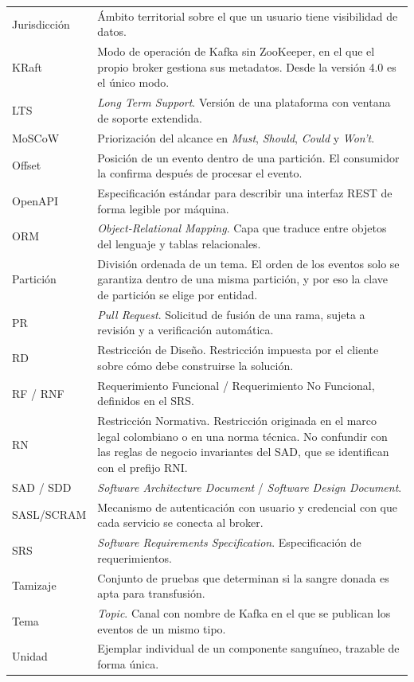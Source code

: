 \documentclass[11pt,a4paper]{article}
\begin{document}
\begin{longtable}{L{3.6cm} L{11.0cm}}
Jurisdicción & Ámbito territorial sobre el que un usuario tiene visibilidad de datos. \\
KRaft & Modo de operación de Kafka sin ZooKeeper, en el que el propio broker gestiona sus metadatos. Desde la versión 4.0 es el único modo. \\
LTS & \emph{Long Term Support}. Versión de una plataforma con ventana de soporte extendida. \\
MoSCoW & Priorización del alcance en \emph{Must}, \emph{Should}, \emph{Could} y \emph{Won't}. \\
Offset & Posición de un evento dentro de una partición. El consumidor la confirma después de procesar el evento. \\
OpenAPI & Especificación estándar para describir una interfaz REST de forma legible por máquina. \\
ORM & \emph{Object-Relational Mapping}. Capa que traduce entre objetos del lenguaje y tablas relacionales. \\
Partición & División ordenada de un tema. El orden de los eventos solo se garantiza dentro de una misma partición, y por eso la clave de partición se elige por entidad. \\
PR & \emph{Pull Request}. Solicitud de fusión de una rama, sujeta a revisión y a verificación automática. \\
RD & Restricción de Diseño. Restricción impuesta por el cliente sobre cómo debe construirse la solución. \\
RF / RNF & Requerimiento Funcional / Requerimiento No Funcional, definidos en el SRS. \\
RN & Restricción Normativa. Restricción originada en el marco legal colombiano o en una norma técnica. No confundir con las reglas de negocio invariantes del SAD, que se identifican con el prefijo RNI. \\
SAD / SDD & \emph{Software Architecture Document} / \emph{Software Design Document}. \\
SASL/SCRAM & Mecanismo de autenticación con usuario y credencial con que cada servicio se conecta al broker. \\
SRS & \emph{Software Requirements Specification}. Especificación de requerimientos. \\
Tamizaje & Conjunto de pruebas que determinan si la sangre donada es apta para transfusión. \\
Tema & \emph{Topic}. Canal con nombre de Kafka en el que se publican los eventos de un mismo tipo. \\
Unidad & Ejemplar individual de un componente sanguíneo, trazable de forma única. \\

\end{longtable}
\end{document}
